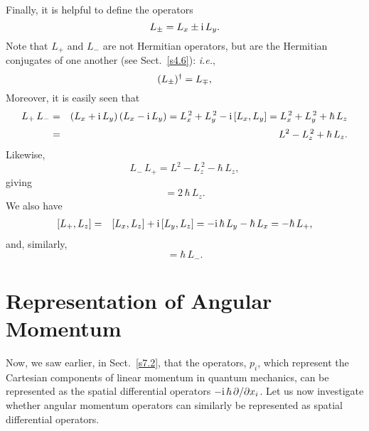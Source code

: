 Finally, it is helpful to define the operators
\begin{equation}\label{e8.13}
L_\pm = L_x\pm {\rm i}\,L_y.
\end{equation}
Note that $L_+$ and $L_-$ are not Hermitian operators, but are
the Hermitian conjugates of one another (see Sect.~\ref{s4.6}): {\em i.e.},
\begin{equation}\label{e8.14}
(L_\pm)^\dag = L_\mp,\\[0.5ex]
\end{equation}
Moreover, it is easily seen that
\begin{eqnarray}
L_+\,L_- &=& (L_x+{\rm i}\,L_y)\,(L_x-{\rm i}\,L_y)
= L_x^{\,2} + L_y^{\,2} - {\rm i}\,[L_x, L_y]
= L_x^{\,2} + L_y^{\,2} + \hbar\,L_z\nonumber\\[0.5ex]
&=& L^2 - L_z^{\,2} + \hbar\,L_z.\label{e8.15}
\end{eqnarray}
Likewise,
\begin{equation}\label{e8.17}
L_-\,L_+ = L^2 - L_z^{\,2} -\hbar\,L_z,
\end{equation}
giving
\begin{equation}
[L_+, L_-] = 2\,\hbar\,L_z.
\end{equation}
We also have
\begin{eqnarray}\label{e8.19}
[L_+,L_z] &=& [L_x,L_z] + {\rm i}\,[L_y,L_z] = -{\rm i}\,\hbar\,L_y - \hbar\,L_x= - \hbar\,L_+,
\end{eqnarray}
and, similarly,
\begin{equation}
[L_-,L_z] = \hbar\,L_-.
\end{equation}

\section{Representation of Angular Momentum}\label{s8.3}
Now, we saw earlier, in Sect.~\ref{s7.2}, that the operators, $p_i$,  which represent
the Cartesian components of linear momentum in quantum mechanics, can be represented
as the spatial differential operators $-{\rm i}\,\hbar\,\partial/\partial x_i$. 
Let us now investigate whether angular momentum operators can similarly
be represented as spatial differential operators.

